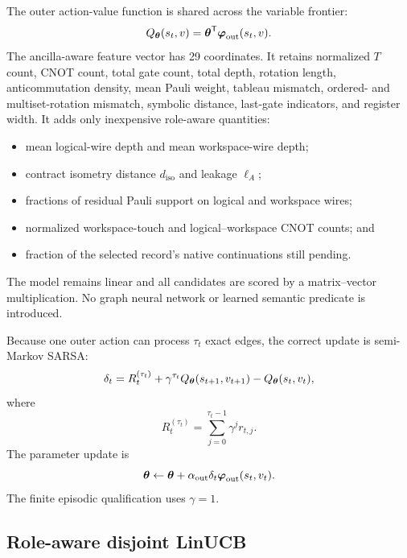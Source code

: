 The outer action-value function is shared across the variable frontier:
\begin{equation}
Q_{\boldsymbol{\theta}}(s_t,v)=\boldsymbol{\theta}^\mathsf T\boldsymbol{\varphi}_{\mathrm{out}}(s_t,v).
\label{eq:outer-q}
\end{equation}
The ancilla-aware feature vector has 29 coordinates. It retains normalized $T$ count, CNOT count, total gate count, total depth, rotation length, anticommutation density, mean Pauli weight, tableau mismatch, ordered- and multiset-rotation mismatch, symbolic distance, last-gate indicators, and register width. It adds only inexpensive role-aware quantities:
\begin{itemize}
\item mean logical-wire depth and mean workspace-wire depth;
\item contract isometry distance $d_{\mathrm{iso}}$ and leakage $\ell_A$;
\item fractions of residual Pauli support on logical and workspace wires;
\item normalized workspace-touch and logical--workspace CNOT counts; and
\item fraction of the selected record's native continuations still pending.
\end{itemize}
The model remains linear and all candidates are scored by a matrix--vector multiplication. No graph neural network or learned semantic predicate is introduced.

Because one outer action can process $\tau_t$ exact edges, the correct update is semi-Markov SARSA:
\begin{equation}
\delta_t=R_t^{(\tau_t)}
+\gamma^{\tau_t}Q_{\boldsymbol{\theta}}(s_{t+1},v_{t+1})
-Q_{\boldsymbol{\theta}}(s_t,v_t),
\label{eq:smdp-sarsa}
\end{equation}
where
\begin{equation}
R_t^{(\tau_t)}=\sum_{j=0}^{\tau_t-1}\gamma^j r_{t,j}.
\end{equation}
The parameter update is
\begin{equation}
\boldsymbol{\theta}\leftarrow
\boldsymbol{\theta}+\alpha_{\mathrm{out}}\delta_t
\boldsymbol{\varphi}_{\mathrm{out}}(s_t,v_t).
\label{eq:outer-update}
\end{equation}
The finite episodic qualification uses $\gamma=1$.

\subsection{Role-aware disjoint LinUCB}

